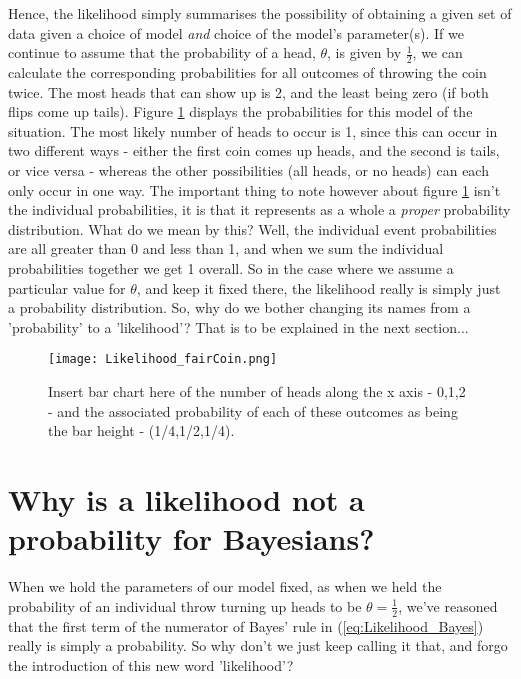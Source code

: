 \documentclass[11pt,fullpage]{book}
\begin{document}
Hence, the likelihood simply summarises the possibility of obtaining a given set of data given a choice of model \textit{and} choice of the model's parameter(s). If we continue to assume that the probability of a head, $\theta$, is given by $\frac{1}{2}$, we can calculate the corresponding probabilities for all outcomes of throwing the coin twice. The most heads that can show up is 2, and the least being zero (if both flips come up tails). Figure \ref{fig:Likelihood_fairCoin} displays the probabilities for this model of the situation. The most likely number of heads to occur is 1, since this can occur in two different ways - either the first coin comes up heads, and the second is tails, or vice versa - whereas the other possibilities (all heads, or no heads) can each only occur in one way. The important thing to note however about figure \ref{fig:Likelihood_fairCoin} isn't the individual probabilities, it is that it represents as a whole a \textit{proper} probability distribution. What do we mean by this? Well, the individual event probabilities are all greater than 0 and less than 1, and when we sum the individual probabilities together we get 1 overall. So in the case where we assume a particular value for $\theta$, and keep it fixed there, the likelihood really is simply just a probability distribution. So, why do we bother changing its names from a 'probability' to a 'likelihood'? That is to be explained in the next section...

\begin{figure}
\centering
\scalebox{0.25} 
{\texttt{[image: Likelihood\_fairCoin.png]}}
\caption{Insert bar chart here of the number of heads along the x axis - 0,1,2 - and the associated probability of each of these outcomes as being the bar height - (1/4,1/2,1/4).}\label{fig:Likelihood_fairCoin}
\end{figure}

\section{Why is a likelihood not a probability for Bayesians?}
When we hold the parameters of our model fixed, as when we held the probability of an individual throw turning up heads to be $\theta=\frac{1}{2}$, we've reasoned that the first term of the numerator of Bayes' rule in (\ref{eq:Likelihood_Bayes}) really is simply a probability. So why don't we just keep calling it that, and forgo the introduction of this new word 'likelihood'? 
\end{document}
